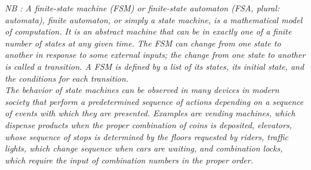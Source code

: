 \documentclass[12pt]{tdtp}
\begin{document}
\textit{NB : A finite-state machine (FSM) or finite-state automaton (FSA, plural: automata), finite automaton, or simply a state machine, is a mathematical model of computation. It is an abstract machine that can be in exactly one of a finite number of states at any given time. The FSM can change from one state to another in response to some external inputs; the change from one state to another is called a transition. A FSM is defined by a list of its states, its initial state, and the conditions for each transition.\\
The behavior of state machines can be observed in many devices in modern society that perform a predetermined sequence of actions depending on a sequence of events with which they are presented. Examples are vending machines, which dispense products when the proper combination of coins is deposited, elevators, whose sequence of stops is determined by the floors requested by riders, traffic lights, which change sequence when cars are waiting, and combination locks, which require the input of combination numbers in the proper order.}
\end{document}
